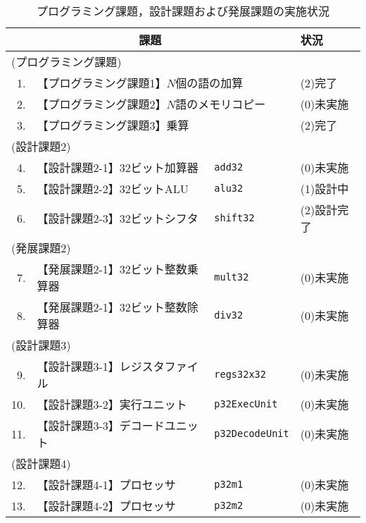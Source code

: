 \documentclass{ujarticle}[11pt]
\begin{document}
    \begin{table}[tb]
    \caption{プログラミング課題，設計課題および発展課題の実施状況}
    \label{tab:プログラミング課題，設計課題および発展課題の実施状況}
    \begin{center}
    {\small
    \begin{tabular}{rll|l}
    \hline
    \hline
    \multicolumn{3}{c|}{課題} & 状況 \\
    \hline
    \multicolumn{3}{l|}{(プログラミング課題)} & \\
    1. & \multicolumn{2}{l|}{【プログラミング課題1】$N$個の語の加算 } & (2)完了 \\
    2. & \multicolumn{2}{l|}{【プログラミング課題2】$N$語のメモリコピー} & (0)未実施 \\
    3. & \multicolumn{2}{l|}{【プログラミング課題3】乗算} & (2)完了 \\
    \multicolumn{3}{l|}{(設計課題2)} & \\
    4. & 【設計課題2-1】32ビット加算器   & \verb|add32|          & (0)未実施 \\
    5. & 【設計課題2-2】32ビットALU      & \verb|alu32|          & (1)設計中 \\
    6. & 【設計課題2-3】32ビットシフタ   & \verb|shift32|        & (2)設計完了 \\
    \multicolumn{3}{l|}{(発展課題2)} & \\
    7. & 【発展課題2-1】32ビット整数乗算器 & \verb|mult32|       & (0)未実施 \\
    8. & 【発展課題2-1】32ビット整数除算器 & \verb|div32|        & (0)未実施 \\
    \multicolumn{3}{l|}{(設計課題3)} & \\
    9. & 【設計課題3-1】レジスタファイル & \verb|regs32x32|      & (0)未実施 \\
    10. & 【設計課題3-2】実行ユニット     & \verb|p32ExecUnit|    & (0)未実施 \\
    11. & 【設計課題3-3】デコードユニット & \verb|p32DecodeUnit|  & (0)未実施 \\
    \multicolumn{3}{l|}{(設計課題4)} & \\
    12. & 【設計課題4-1】プロセッサ      & \verb|p32m1|          & (0)未実施 \\
    13. & 【設計課題4-2】プロセッサ      & \verb|p32m2|          & (0)未実施 \\

\end{tabular}}
\end{center}
\end{table}
\end{document}
